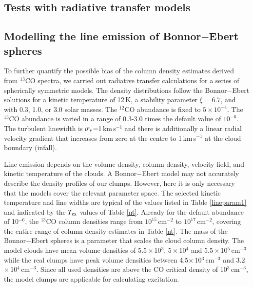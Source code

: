 \documentclass[printer]{aa}
\begin{document}





\begin{appendix}

\section{Tests with radiative transfer models}
\label{radtransfermodel} 

\subsection{Modelling the line emission of Bonnor$-$Ebert spheres}

\label{modeling1}

To further quantify the possible bias of the column density estimates
derived from $^{13}$CO spectra, we carried out radiative transfer
calculations for a series of spherically symmetric models. The density
distributions follow the Bonnor$-$Ebert solutions for a kinetic temperature of 12\,K, a stability
parameter $\xi=6.7$, and with 0.3, 1.0, or 3.0 solar masses. The
$^{12}$CO abundance is fixed to $5\times 10^{-4}$. The $^{13}$CO
abundance is varied in a range of 0.3-3.0 times the default value of
$10^{-6}$. The turbulent linewidth is $\sigma_{\rm v}$=1\,km\,s$^{-1}$
and there is additionally a linear radial velocity gradient that
increases from zero at the centre to 1\,km\,s$^{-1}$ at the cloud
boundary (infall).

Line emission depends on the volume density, column density, velocity
field, and kinetic temperature of the clouds. A Bonnor$-$Ebert model may
not accurately describe the density profiles of our clumps. However,
here it is only necessary that the models cover the relevant parameter
space. The selected kinetic temperature and line widths are typical of
the values listed in Table \ref{lineparam1} and indicated by the $T_{\rm ex}$ values of
Table \ref{nt}. Already for the default abundance of 10$^{-6}$, the $^{13}$CO
column densities range from $10^{15}$\,cm$^{-2}$ to
$10^{17}$\,cm$^{-2}$, covering the entire range of column density
estimates in Table \ref{nt}. The mass of the Bonnor$-$Ebert spheres is a parameter that scales the cloud column density. The model clouds have mean volume densities of 5.5\,$\times$\,10$^{3}$, 5\,$\times$\,10$^{4}$ and 5.5\,$\times$\,10$^{5}$\,cm$^{-3}$  while the real clumps have peak volume densities between 4.5$\times$\,10$^{3}$\,cm$^{-3}$ and 3.2\,$\times$\,10$^{4}$\,cm$^{-3}$. Since all used densities are above the CO critical density of 10$^3$\,cm$^{-3}$, the model clumps are applicable for calculating excitation.


\end{appendix}
\end{document}
